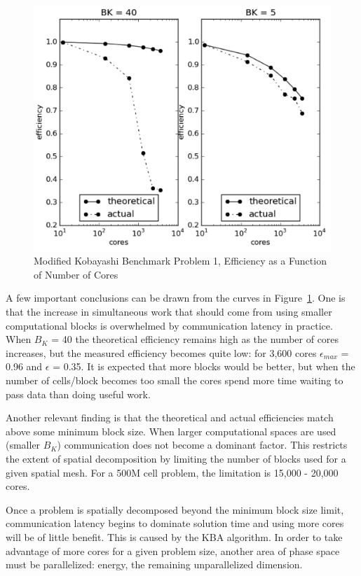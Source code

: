 \begin{figure}[!h]
  \begin{center}
    \includegraphics [width=.85\textwidth, height=0.5\textheight ] {JagBlockStudy}
  \end{center}
  \caption{Modified Kobayashi Benchmark Problem 1, Efficiency as a Function of Number of Cores}
  \label{fig:JagBlockStudy}
\end{figure}

A few important conclusions can be drawn from the curves in Figure~\ref{fig:JagBlockStudy}. One is that the increase in simultaneous work that should come from using smaller computational blocks is overwhelmed by communication latency in practice. When $B_{K}$ = 40 the theoretical efficiency remains high as the number of cores increases, but the measured efficiency becomes quite low: for 3,600 cores $\epsilon_{max}$ = 0.96 and $\epsilon$ = 0.35. It is expected that more blocks would be better, but when the number of cells/block becomes too small the cores spend more time waiting to pass data than doing useful work. 

Another relevant finding is that the theoretical and actual efficiencies match above some minimum block size. When larger computational spaces are used (smaller $B_{K}$) communication does not become a dominant factor. This restricts the extent of spatial decomposition by limiting the number of blocks used for a given spatial mesh. For a 500M cell problem, the limitation is 15,000 - 20,000 cores. 

Once a problem is spatially decomposed beyond the minimum block size limit, communication latency begins to dominate solution time and using more cores will be of little benefit. This is caused by the KBA algorithm. In order to take advantage of more cores for a given problem size, another area of phase space must be parallelized: energy, the remaining unparallelized dimension. 

